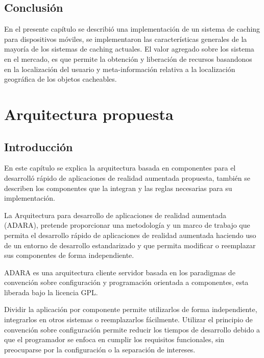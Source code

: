 \documentclass[12pt,a4paper,spanish,openany]{book}
\begin{document}
\section{Conclusión}
En el presente capítulo se describió una implementación de un sistema de caching
para dispositivos móviles, se implementaron las características generales de la
mayoría de los sistemas de caching actuales. El valor agregado sobre los sistema
en el mercado, es que permite la obtención y liberación de recursos basandonos
en la localización del usuario y meta-información relativa a la localización
geográfica de los objetos cacheables.







\chapter{Arquitectura propuesta}

\section{Introducción}
En este capítulo se explica la arquitectura basada en componentes para el
desarrolló rápido de aplicaciones de realidad aumentada propuesta, también se
describen los componentes que la integran y las reglas necesarias para su
implementación.

La Arquitectura para desarrollo de aplicaciones de realidad aumentada
(ADARA), pretende proporcionar una metodología y un marco de trabajo que permita
el desarrollo rápido de aplicaciones de realidad aumentada haciendo uso de un
entorno de desarrollo estandarizado y que permita modificar o reemplazar sus
componentes de forma independiente.

ADARA es una arquitectura cliente servidor basada en los paradigmas de
convención sobre configuración y programación orientada a componentes, esta
liberada bajo la licencia GPL.

Dividir la aplicación por componente permite utilizarlos de forma independiente,
integrarlos en otros sistemas o reemplazarlos fácilmente. 
Utilizar el principio de convención sobre configuración permite reducir los
tiempos de desarrollo debido a que el programador se enfoca en cumplir los
requisitos funcionales, sin preocuparse por la configuración o la separación de
intereses.
\end{document}
